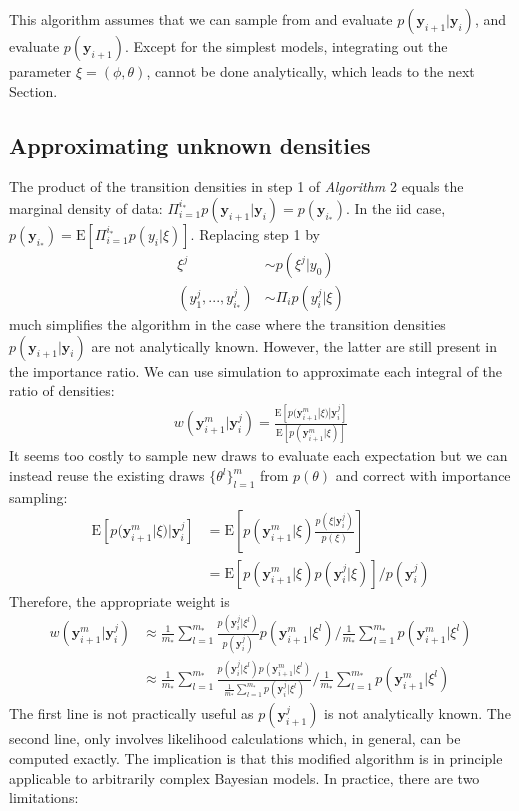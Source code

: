 \documentclass[11pt]{article}
\begin{document}
This algorithm assumes that we can sample from and evaluate $p(\mathbf{y}_{i+1}|\mathbf{y}_i)$, and evaluate $p(\mathbf{y}_{i+1})$. Except for the simplest models, integrating out the parameter $\xi=(\phi,\theta)$, cannot be done analytically, which leads to the next Section.
\subsection{Approximating unknown densities}
The product of the transition densities in step 1 of \emph{Algorithm} 2 equals the marginal density of data:
$\Pi_{i=1}^{i_*} p(\mathbf{y}_{i+1}|\mathbf{y}_i)=p(\mathbf{y}_{i_*})$. In the iid case, $p(\mathbf{y}_{i_*})=\mathrm{E}[\Pi_{i=1}^{i_*} p(y_i|\xi)]$. Replacing step 1 by \begin{align}\xi^j&\sim p(\xi^j|y_0)\\(y_1^j,...,y_{i_*}^j)&\sim \Pi_i p(y_i^j|\xi)\end{align} much simplifies the algorithm in the case where the transition densities $p(\mathbf{y}_{i+1}|\mathbf{y}_{i})$ are not analytically known. However, the latter are still present in the importance ratio. We can use simulation to approximate each integral of the ratio of densities:
\begin{align}
w(\mathbf{y}_{i+1}^m|\mathbf{y}_i^j)=\frac{\mathrm{E}[p(\mathbf{y}_{i+1}^m|\xi)|\mathbf{y}_{i}^j]}{\mathrm{E}[p(\mathbf{y}_{i+1}^m|\xi)]}
\end{align}It seems too costly to sample new draws to evaluate each expectation but we can instead reuse the existing draws $\{\theta^l\}_{l=1}^m$ from $p(\theta)$ and correct with importance sampling: 
\begin{align}
\mathrm{E}[p(\mathbf{y}_{i+1}^m|\xi)|\mathbf{y}_{i}^j]&=\mathrm{E}[p(\mathbf{y}_{i+1}^m|\xi)\frac{p(\xi|\mathbf{y}_{i}^j)}{p(\xi)}]\\
&=\mathrm{E}[p(\mathbf{y}_{i+1}^m|\xi)p(\mathbf{y}_{i}^j|\xi)]/p(\mathbf{y}_{i}^j)
\end{align}Therefore, the appropriate weight is
\begin{align}
w(\mathbf{y}_{i+1}^m|\mathbf{y}_i^j)
&\approx\frac{1}{m_*}\sum_{l=1}^{m_*} \frac{p(\mathbf{y}_{i}^j|\xi^l)}{p(\mathbf{y}_{i}^j)} p(\mathbf{y}_{i+1}^m|\xi^l)/\frac{1}{m_*}\sum_{l=1}^{m_*} p(\mathbf{y}_{i+1}^m|\xi^l)\\\label{br_is_cont_w_approx}
&\approx \frac{1}{m_*}\sum_{l=1}^{m_*} \frac{p(\mathbf{y}_{i}^j|\xi^l)p(\mathbf{y}_{i+1}^m|\xi^l)}{\frac{1}{m_*}\sum_{l=1}^{m_*} p(\mathbf{y}_{i}^j|\xi^l)}/\frac{1}{m_*}\sum_{l=1}^{m_*} p(\mathbf{y}_{i+1}^m|\xi^l)
\end{align}The first line is not practically useful as $p(\mathbf{y}_{i+1}^j)$ is not analytically known. The second line, only involves likelihood calculations which, in general, can be computed exactly. The implication is that this modified algorithm is in principle applicable to arbitrarily complex Bayesian models. In practice, there are two limitations:
\end{document}
